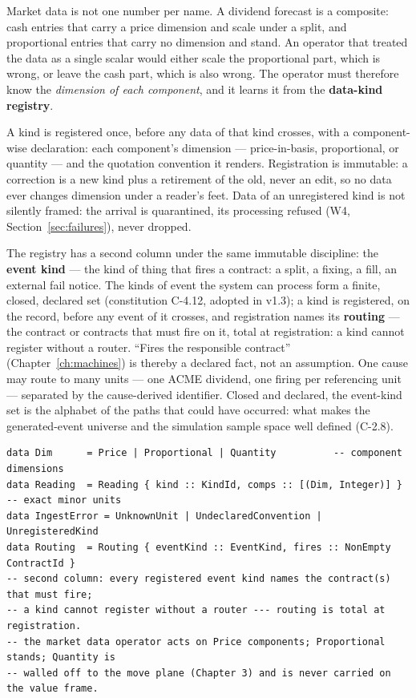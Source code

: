 \documentclass[11pt,a4paper]{article}
\begin{document}
Market data is not one number per name. A dividend forecast is a composite: cash entries
that carry a price dimension and scale under a split, and proportional entries that carry
no dimension and stand. An operator that treated the data as a single scalar would either
scale the proportional part, which is wrong, or leave the cash part, which is also wrong.
The operator must therefore know the \emph{dimension of each component}, and it learns it
from the \textbf{data-kind registry}.

A kind is registered once, before any data of that kind crosses, with a component-wise
declaration: each component's dimension --- price-in-basis, proportional, or quantity ---
and the quotation convention it renders. Registration is immutable: a correction is a new
kind plus a retirement of the old, never an edit, so no data ever changes dimension under
a reader's feet. Data of an unregistered kind is not silently framed: the arrival is
quarantined, its processing refused (W4, Section~\ref{sec:failures}), never dropped.

The registry has a second column under the same immutable discipline: the \textbf{event
kind} --- the kind of thing that fires a contract: a split, a fixing, a fill, an external
fail notice. The kinds of event the system can process form a finite, closed, declared set
(constitution C-4.12, adopted in v1.3); a kind is registered, on the record, before any
event of it crosses, and registration names its \textbf{routing} --- the contract or
contracts that must fire on it, total at registration: a kind cannot register without a
router. ``Fires the responsible contract'' (Chapter~\ref{ch:machines}) is thereby a
declared fact, not an assumption. One cause may route to many units --- one ACME dividend,
one firing per referencing unit --- separated by the cause-derived identifier. Closed and
declared, the event-kind set is the alphabet of the paths that could have occurred: what
makes the generated-event universe and the simulation sample space well defined (C-2.8).

\begin{lstlisting}
data Dim      = Price | Proportional | Quantity          -- component dimensions
data Reading  = Reading { kind :: KindId, comps :: [(Dim, Integer)] }  -- exact minor units
data IngestError = UnknownUnit | UndeclaredConvention | UnregisteredKind
data Routing  = Routing { eventKind :: EventKind, fires :: NonEmpty ContractId }
-- second column: every registered event kind names the contract(s) that must fire;
-- a kind cannot register without a router --- routing is total at registration.
-- the market data operator acts on Price components; Proportional stands; Quantity is
-- walled off to the move plane (Chapter 3) and is never carried on the value frame.
\end{lstlisting}
\end{document}
